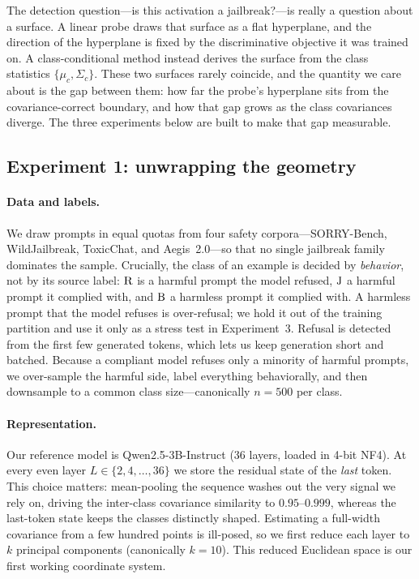 The detection question---is this activation a jailbreak?---is really a question about a
surface. A linear probe draws that surface as a flat hyperplane, and the direction of the
hyperplane is fixed by the discriminative objective it was trained on. A class-conditional
method instead derives the surface from the class statistics $\{\mu_c, \Sigma_c\}$. These two
surfaces rarely coincide, and the quantity we care about is the gap between them: how far the
probe's hyperplane sits from the covariance-correct boundary, and how that gap grows as the
class covariances diverge. The three experiments below are built to make that gap measurable.

\subsection{Experiment 1: unwrapping the geometry}
\label{sec:e1}

\paragraph{Data and labels.}
We draw prompts in equal quotas from four safety corpora---SORRY-Bench, WildJailbreak,
ToxicChat, and Aegis~2.0---so that no single jailbreak family dominates the sample. Crucially,
the class of an example is decided by \emph{behavior}, not by its source label: $\mathrm{R}$ is a
harmful prompt the model refused, $\mathrm{J}$ a harmful prompt it complied with, and $\mathrm{B}$ a harmless
prompt it complied with. A harmless prompt that the model refuses is over-refusal; we hold it
out of the training partition and use it only as a stress test in Experiment~3. Refusal is
detected from the first few generated tokens, which lets us keep generation short and batched.
Because a compliant model refuses only a minority of harmful prompts, we over-sample the
harmful side, label everything behaviorally, and then downsample to a common class
size---canonically $n = 500$ per class.

\paragraph{Representation.}
Our reference model is Qwen2.5-3B-Instruct (36 layers, loaded in 4-bit NF4). At every even
layer $L \in \{2, 4, \dots, 36\}$ we store the residual state of the \emph{last} token. This
choice matters: mean-pooling the sequence washes out the very signal we rely on, driving the
inter-class covariance similarity to $0.95$--$0.999$, whereas the last-token state keeps the
classes distinctly shaped. Estimating a full-width covariance from a few hundred points is
ill-posed, so we first reduce each layer to $k$ principal components (canonically $k = 10$).
This reduced Euclidean space is our first working coordinate system.

